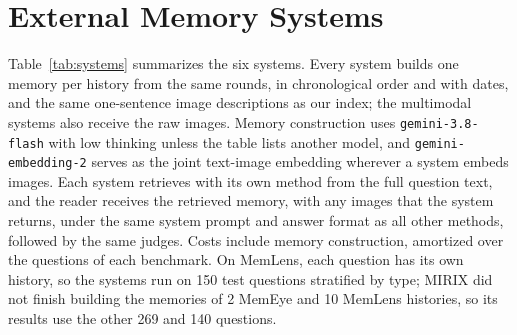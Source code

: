 

\section{External Memory Systems}
\label{app:baselines}

Table~\ref{tab:systems} summarizes the six systems. Every system builds one memory per history from the same rounds, in chronological order and with dates, and the same one-sentence image descriptions as our index; the multimodal systems also receive the raw images. Memory construction uses \texttt{gemini-3.8-flash} with low thinking unless the table lists another model, and \texttt{gemini-embedding-2} serves as the joint text-image embedding wherever a system embeds images. Each system retrieves with its own method from the full question text, and the reader receives the retrieved memory, with any images that the system returns, under the same system prompt and answer format as all other methods, followed by the same judges. Costs include memory construction, amortized over the questions of each benchmark. On MemLens, each question has its own history, so the systems run on 150 test questions stratified by type; MIRIX did not finish building the memories of 2 MemEye and 10 MemLens histories, so its results use the other 269 and 140 questions.

